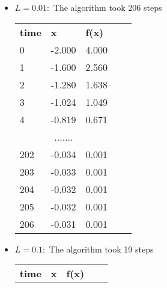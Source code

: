 \documentclass{article}
\begin{document}
\begin{itemize}
    \item \textbf{$L = 0.01:$} The algorithm took 206 steps
    \begin{table}[]
        \begin{tabular}{|lll|ll}
        \cline{1-3}
        \multicolumn{1}{|l|}{\textbf{time}} & \multicolumn{1}{l|}{\textbf{x}} & \textbf{f(x)} &  &  \\ \cline{1-3}
        \multicolumn{1}{|l|}{0}             & \multicolumn{1}{l|}{-2.000}     & 4.000         &  &  \\ \cline{1-3}
        \multicolumn{1}{|l|}{1}             & \multicolumn{1}{l|}{-1.600}     & 2.560         &  &  \\ \cline{1-3}
        \multicolumn{1}{|l|}{2}             & \multicolumn{1}{l|}{-1.280}     & 1.638         &  &  \\ \cline{1-3}
        \multicolumn{1}{|l|}{3}             & \multicolumn{1}{l|}{-1.024}     & 1.049         &  &  \\ \cline{1-3}
        \multicolumn{1}{|l|}{4}             & \multicolumn{1}{l|}{-0.819}     & 0.671         &  &  \\ \cline{1-3}
        \multicolumn{3}{|c|}{.......}                                                         &  &  \\ \cline{1-3}
        \multicolumn{1}{|l|}{202}           & \multicolumn{1}{l|}{-0.034}     & 0.001         &  &  \\ \cline{1-3}
        \multicolumn{1}{|l|}{203}           & \multicolumn{1}{l|}{-0.033}     & 0.001         &  &  \\ \cline{1-3}
        \multicolumn{1}{|l|}{204}           & \multicolumn{1}{l|}{-0.032}     & 0.001         &  &  \\ \cline{1-3}
        \multicolumn{1}{|l|}{205}           & \multicolumn{1}{l|}{-0.032}     & 0.001         &  &  \\ \cline{1-3}
        \multicolumn{1}{|l|}{206}           & \multicolumn{1}{l|}{-0.031}     & 0.001         &  &  \\ \cline{1-3}
        \end{tabular}
        \end{table}
    \item \textbf{$L = 0.1:$} The algorithm took 19 steps    
    \begin{table}[]
        \begin{tabular}{|lll|ll}
        \cline{1-3}
        \multicolumn{1}{|l|}{\textbf{time}} & \multicolumn{1}{l|}{\textbf{x}} & \textbf{f(x)} &  &  \\ \cline{1-3}

\end{tabular}
\end{table}
\end{itemize}
\end{document}
